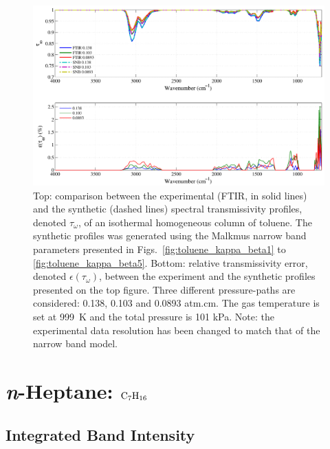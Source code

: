 \begin{figure}[p]
\includegraphics[width=\textwidth]{Figures/Comparison_Fit_Toluene_MALKMUS_Temp999K.pdf}
\caption{Top: comparison between the experimental (FTIR, in solid lines) and the synthetic (dashed lines) spectral transmissivity profiles, denoted $\tau_{\omega}$, of an isothermal homogeneous column of toluene. The synthetic profiles was generated using the Malkmus narrow band parameters presented in Figs.~\ref{fig:toluene_kappa_beta1} to \ref{fig:toluene_kappa_beta5}. Bottom: relative transmissivity error, denoted $\epsilon{(\tau_{\omega})}$, between the experiment and the synthetic profiles presented on the top figure. Three different pressure-paths are considered: 0.138, 0.103 and 0.0893 atm.cm. The gas temperature is set at 999~K and the total pressure is 101 kPa. Note: the experimental data resolution has been changed to match that of the narrow band model. \label{fig:toluene_SNBVerify_999K}}
\end{figure}


\clearpage

\section{\textit{n}-Heptane: $\rm C_7H_{16}$}

\subsection{Integrated Band Intensity}

